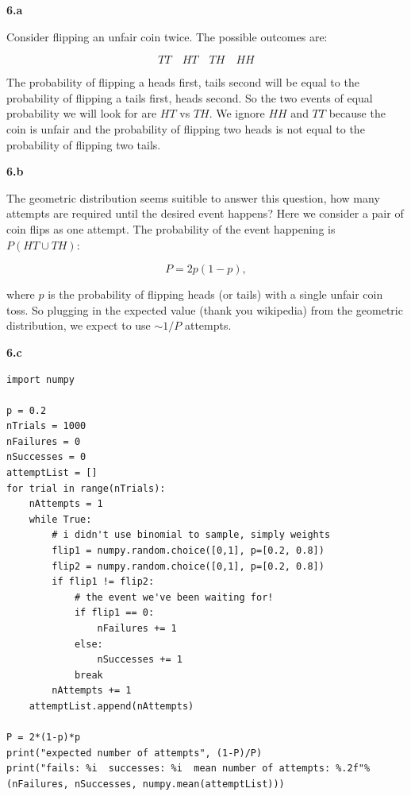 \documentclass{article}
\newcommand{\1}{\mathbf{1}}
\begin{document}
\vspace{\baselineskip}
\noindent \textbf{\large 6.a}

Consider flipping an unfair coin twice.  The possible outcomes are:

$$
TT \quad HT \quad TH \quad HH
$$

The probability of flipping a heads first, tails second will be equal to the probability of flipping a tails first, heads second.  So the two events of equal probability we will look for are $HT$ vs $TH$.  We ignore $HH$ and $TT$ because the coin is unfair and the probability of flipping two heads is not equal to the probability of flipping two tails.

\vspace{\baselineskip}
\noindent \textbf{\large 6.b}

The geometric distribution seems suitible to answer this question, how many attempts are required until the desired event happens?  Here we consider a pair of coin flips as one attempt.  The probability of the event happening is $P(HT \cup TH)$:

$$
P = 2p(1-p),
$$

where $p$ is the probability of flipping heads (or tails) with a single unfair coin toss.  So plugging in the expected value (thank you wikipedia) from the geometric distribution, we expect to use $\sim 1/P$ attempts.


\vspace{\baselineskip}
\noindent \textbf{\large 6.c}

\begin{verbatim}
import numpy

p = 0.2
nTrials = 1000
nFailures = 0
nSuccesses = 0
attemptList = []
for trial in range(nTrials):
    nAttempts = 1
    while True:
        # i didn't use binomial to sample, simply weights
        flip1 = numpy.random.choice([0,1], p=[0.2, 0.8])
        flip2 = numpy.random.choice([0,1], p=[0.2, 0.8])
        if flip1 != flip2:
            # the event we've been waiting for!
            if flip1 == 0:
                nFailures += 1
            else:
                nSuccesses += 1
            break
        nAttempts += 1
    attemptList.append(nAttempts)

P = 2*(1-p)*p
print("expected number of attempts", (1-P)/P)
print("fails: %i  successes: %i  mean number of attempts: %.2f"%(nFailures, nSuccesses, numpy.mean(attemptList)))
\end{verbatim}
\end{document}
